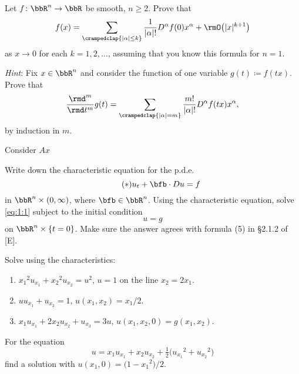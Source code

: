 \begin{problem}
  Let \(f\colon\bbR^n\to\bbR\) be smooth, \(n\geq 2\). Prove that
  \[
    f(x)=\sum_{\crampedclap{|\alpha|\leq k}}
    \frac{1}{|\alpha|!}D^\alpha f(0)x^\alpha+\rmO\bigl( |x|^{k+1} \bigr)
  \]
  as \(x\to 0\) for each \(k=1,2,\dotsc\), assuming that you know this
  formula for \(n=1\).

  \emph{Hint}: Fix \(x\in\bbR^n\) and consider the function of one variable
  \(g(t)\coloneqq f(tx)\). Prove that
  \[
    \frac{\rmd^m}{\rmd t^m}g(t)
    =\sum_{\crampedclap{|\alpha|=m}}\frac{m!}{|\alpha|!} D^\alpha f(tx)x^\alpha,
  \]
  by induction in \(m\).
\end{problem}
\begin{solution}
  Consider \(Ax\) 
\end{solution}
\newpage

\begin{problem}
  Write down the characteristic equation for the p.d.e.\@
  \[
    \label{eq:1:1}
    \tag{\(*\)}
    u_t+\bfb\cdot Du=f
  \]
  in \(\bbR^n\times(0,\infty)\), where \(\bfb\in\bbR^n\). Using the
  characteristic equation, solve \eqref{eq:1:1} subject to the initial
  condition
  \[
    u=g
  \]
  on \(\bbR^n\times\{t=0\}\). Make sure the answer agrees with formula (5)
  in \S 2.1.2 of [E].
\end{problem}
\begin{solution}

\end{solution}
\newpage

\begin{problem}
  Solve using the characteristics:
  \begin{enumerate}[label=(\alph*)]
  \item \({x_1}^{\!2}u_{x_1}+{x_2}^{\!2}u_{x_2}=u^2\), \(u=1\) on the line
    \(x_2=2x_1\).
  \item \(uu_{x_1}+u_{x_2}=1\), \(u(x_1,x_2)=x_1/2\).
  \item \(x_1u_{x_1}+2x_2u_{x_2}+u_{x_3}=3u\),
    \(u(x_1,x_2,0)=g(x_1,x_2)\).
  \end{enumerate}
\end{problem}
\begin{solution}

\end{solution}
\newpage

\begin{problem}
  For the equation
  \[
    u=x_1u_{x_1}+x_2u_{x_2}+\tfrac{1}{2}\bigl({u_{x_1}}^{\!\!\!2}+{u_{x_2}}^{\!\!\!2}\bigr)
  \]
  find a solution with \(u(x_1,0)=\bigl(1-{x_1}^{\!2}\bigr)/2\).
\end{problem}
\begin{solution}

\end{solution}

